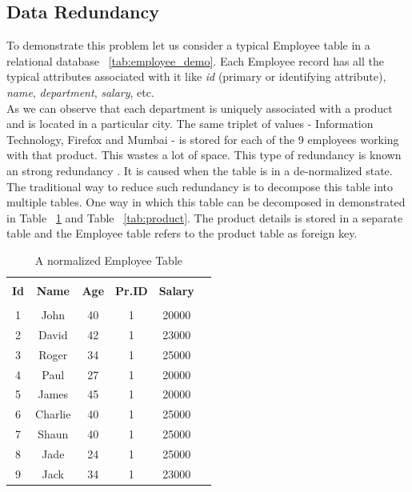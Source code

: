 \documentclass[12pt, oneside]{book}
\begin{document}
\subsection{Data Redundancy}
To demonstrate this problem let us consider a typical Employee table in a relational database ~\ref{tab:employee_demo}. Each Employee record has all the typical attributes associated with it like \emph{id} (primary or identifying attribute), \emph{name}, \emph{department}, \emph{salary}, etc. \\
As we can observe that each department is uniquely associated with a product and is located in a particular city. The same triplet of values - Information Technology, Firefox and Mumbai - is stored for each of the 9 employees working with that product. This wastes a lot of space. This type of redundancy is known an strong redundancy \cite{redundancy}. It is caused when the table is in a de-normalized state. The traditional way to reduce such redundancy is to decompose this table into multiple tables. One way in which this table can be decomposed in demonstrated in Table ~\ref{tab:emp_normal} and Table ~\ref{tab:product}. The product details is stored in a separate table and the Employee table refers to the product table as foreign key.

\begin{table}
    \centering
    \begin{tabular}{| c | c | c | c | c | @{}m{0pt}@{}}
    \hline
    \multicolumn{1}{|c|}{} & \multicolumn{1}{c|}{} & \multicolumn{1}{c|}{} & \multicolumn{1}{c|}{} & \multicolumn{1}{c|}{} &  \\
    \multicolumn{1}{|c|}{\textbf{Id}} & \multicolumn{1}{c|}{\textbf{Name}} & \multicolumn{1}{c|}{\textbf{Age}} & \multicolumn{1}{c|}{\textbf{Pr.ID}} & \multicolumn{1}{c|}{\textbf{Salary}} & \\
    \multicolumn{1}{|c|}{} & \multicolumn{1}{c|}{} & \multicolumn{1}{c|}{} & \multicolumn{1}{c|}{} & \multicolumn{1}{c|}{} &  \\
    \hline
    1 & John & 40 & 1 & 20000 & \\ [1ex] \hline
    2 & David & 42 & 1 & 23000 & \\ [1ex] \hline
    3 & Roger & 34 & 1 & 25000 & \\ [1ex] \hline
    4 & Paul & 27 & 1 & 20000 & \\ [1ex] \hline
    5 & James & 45 & 1 & 20000 & \\ [1ex] \hline
    6 & Charlie & 40 & 1 & 25000 & \\ [1ex] \hline
    7 & Shaun & 40 & 1 & 25000 & \\ [1ex] \hline
    8 & Jade & 24 & 1 & 25000 & \\ [1ex] \hline
    9 & Jack & 34 & 1 & 23000 & \\ [1ex] \hline
    \end{tabular}
    \caption{A normalized Employee Table}
    \label{tab:emp_normal}
\end{table}
\end{document}
